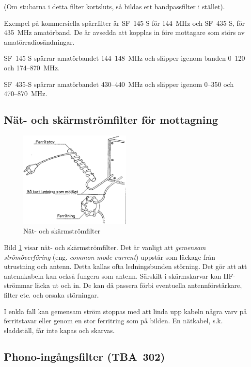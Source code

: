 (Om stubarna i detta filter kortsluts, så bildas ett bandpassfilter i stället).

Exempel på kommersiella spärrfilter är SF~145-S för 144~MHz och
SF~435-S, för 435~MHz amatörband.
De är avsedda att kopplas in före mottagare som störs av amatörradiosändningar.

SF~145-S spärrar amatörbandet 144--148~MHz och släpper igenom banden
0--120 och 174--870~MHz.

SF~435-S spärrar amatörbandet 430--440~MHz och släpper igenom
0--350 och 470--870~MHz.

\subsection{Nät- och skärmströmfilter för mottagning}

\begin{figure}
  \includegraphics[width=0.5\textwidth]{images/cropped_pdfs/bild_2_9-07.pdf}
  \caption{Nät- och skärmströmfilter}
  \label{fig:bildII9-7}
\end{figure}

Bild \ref{fig:bildII9-7} visar nät- och skärmströmfilter.
Det är vanligt att \emph{gemensam strömöverföring} (eng.
\emph{common mode current}) uppstår som läckage från utrustning och antenn.
Detta kallas ofta ledningsbunden störning.
Det gör att att antennkabeln kan också fungera som antenn.
Särskilt i skärmskarvar kan HF-strömmar läcka ut och in.
De kan då passera förbi eventuella antennförstärkare, filter etc. och orsaka
störningar.

I enkla fall kan gemensam ström stoppas med att linda upp kabeln några varv på
ferritstavar eller genom en stor ferritring som på bilden.
En nätkabel, s.k. sladdställ, får inte kapas och skarvas.

\subsection{Phono-ingångsfilter (TBA~302)}

